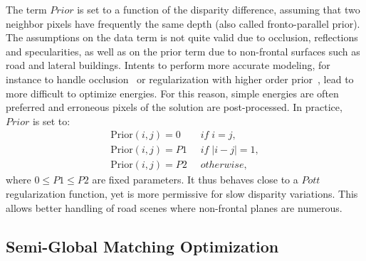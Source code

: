 \documentclass{article}
\begin{document}
The term $Prior$ is set to a function of the disparity difference, assuming that two neighbor pixels have frequently the same depth (also called fronto-parallel prior). The assumptions on the data term is not quite valid due to occlusion, reflections and specularities, as well as on the prior term due to non-frontal surfaces such as road and lateral buildings. Intents to perform more accurate modeling, for instance to handle occlusion~\cite{kolmogorov01,kolmogorovIPOL} or regularization with higher order prior~\cite{ranftl12}, lead to more difficult to optimize energies. For this reason, simple energies are often preferred and erroneous pixels of the solution are post-processed. In practice, $Prior$ is set to:
\begin{equation}
\begin{split}
\text{Prior}(i,j) = 0 & \; \; if \; i=j, \\
\text{Prior}(i,j) = P1 & \; \; if \; |i-j| = 1, \\
\text{Prior}(i,j) = P2 & \; \; otherwise,
\end{split}
\end{equation}
where $0\leq P1\leq P2$ are fixed parameters.
It thus behaves close to a $Pott$ regularization function, yet is more permissive for slow disparity variations. This allows better handling of road scenes where non-frontal planes are numerous.

\subsection{Semi-Global Matching Optimization}
\label{ss:sgm}
\end{document}

